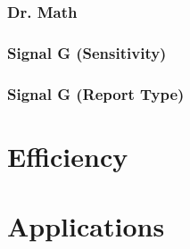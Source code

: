 \subsubsection{Dr. Math}
\subsubsection{Signal G (Sensitivity)}
\subsubsection{Signal G (Report Type)}

\section{Efficiency}
\label{Efficiency}

\section{Applications}
\label{Applications}
